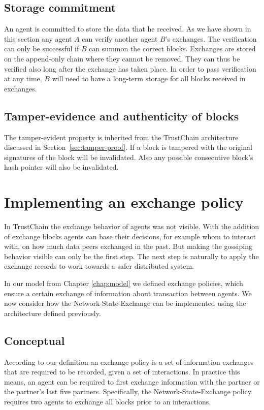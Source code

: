 \subsection{Storage commitment}
An agent is committed to store the data that he received. As we have shown in this section any agent
$A$ can verify another agent $B$'s exchanges. The verification can only be successful if $B$ can 
summon the correct blocks. Exchanges are stored on the append-only chain where they cannot be 
removed. They can thus be verified also long after the exchange has taken place. In order to pass
verification at any time, $B$ will need to have a long-term storage for all blocks received in 
exchanges.

\subsection{Tamper-evidence and authenticity of blocks}
The tamper-evident property is inherited from the TrustChain architecture discussed in 
Section~\ref{sec:tamper-proof}. If a block is tampered with the original signatures of the block 
will be invalidated. Also any possible consecutive block's hash pointer will also be invalidated.

\section{Implementing an exchange policy}
In TrustChain the exchange behavior of agents was not visible. With the addition of exchange blocks
agents can base their decisions, for example whom to interact with, on how much data 
peers exchanged in the past. But making the gossiping behavior visible can only be the first step. 
The next step is naturally to apply the exchange records to work towards a safer distributed system.

In our model from Chapter \ref{chap:model} we defined exchange policies, which 
ensure a certain exchange of information about transaction between agents. We now consider how the
Network-State-Exchange can be implemented using the architecture defined previously. 

\subsection{Conceptual}
According to our definition an exchange policy is a set of information exchanges that are required
to be recorded, given a set of interactions. In practice this means, an agent can be required to 
first exchange information with the partner or the partner's last five partners. Specifically, the
Network-State-Exchange policy requires two agents to exchange all blocks prior to an interactions.

